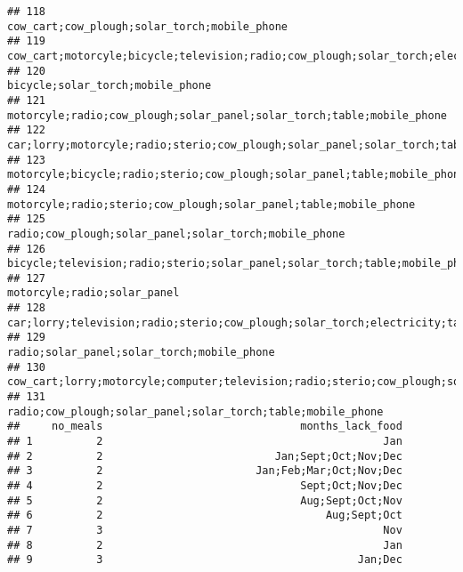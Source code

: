 \documentclass[
]{article}
\begin{document}
\begin{verbatim}
## 118                                                                                             cow_cart;cow_plough;solar_torch;mobile_phone
## 119                        cow_cart;motorcyle;bicycle;television;radio;cow_plough;solar_torch;electricity;table;sofa_set;mobile_phone;fridge
## 120                                                                                                         bicycle;solar_torch;mobile_phone
## 121                                                                    motorcyle;radio;cow_plough;solar_panel;solar_torch;table;mobile_phone
## 122                                   car;lorry;motorcyle;radio;sterio;cow_plough;solar_panel;solar_torch;table;sofa_set;mobile_phone;fridge
## 123                                                                 motorcyle;bicycle;radio;sterio;cow_plough;solar_panel;table;mobile_phone
## 124                                                                         motorcyle;radio;sterio;cow_plough;solar_panel;table;mobile_phone
## 125                                                                                    radio;cow_plough;solar_panel;solar_torch;mobile_phone
## 126                                                               bicycle;television;radio;sterio;solar_panel;solar_torch;table;mobile_phone
## 127                                                                                                              motorcyle;radio;solar_panel
## 128                                  car;lorry;television;radio;sterio;cow_plough;solar_torch;electricity;table;sofa_set;mobile_phone;fridge
## 129                                                                                               radio;solar_panel;solar_torch;mobile_phone
## 130                    cow_cart;lorry;motorcyle;computer;television;radio;sterio;cow_plough;solar_panel;solar_torch;electricity;mobile_phone
## 131                                                                              radio;cow_plough;solar_panel;solar_torch;table;mobile_phone
##     no_meals                               months_lack_food
## 1          2                                            Jan
## 2          2                           Jan;Sept;Oct;Nov;Dec
## 3          2                        Jan;Feb;Mar;Oct;Nov;Dec
## 4          2                               Sept;Oct;Nov;Dec
## 5          2                               Aug;Sept;Oct;Nov
## 6          2                                   Aug;Sept;Oct
## 7          3                                            Nov
## 8          2                                            Jan
## 9          3                                        Jan;Dec

\end{verbatim}
\end{document}
